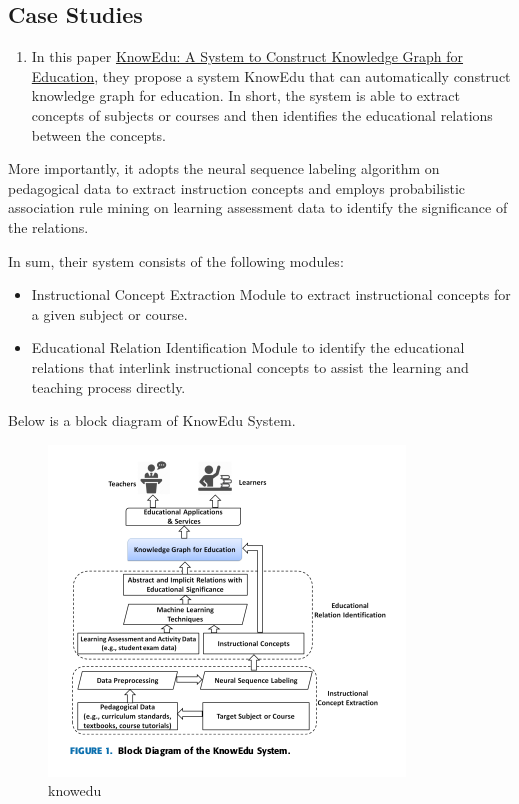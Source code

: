 \documentclass[]{book}
\providecommand{\tightlist}{%
  \setlength{\itemsep}{0pt}\setlength{\parskip}{0pt}}
\theoremstyle{definition}
\theoremstyle{definition}
\theoremstyle{definition}
\theoremstyle{remark}
\begin{document}
\subsection{Case Studies}\label{case-studies-5}

\begin{enumerate}
\def\labelenumi{\arabic{enumi}.}
\tightlist
\item
  In this paper
  \href{https://ieeexplore.ieee.org/document/8362657}{KnowEdu: A System
  to Construct Knowledge Graph for Education}, they propose a system
  KnowEdu that can automatically construct knowledge graph for
  education. In short, the system is able to extract concepts of
  subjects or courses and then identifies the educational relations
  between the concepts.
\end{enumerate}

More importantly, it adopts the neural sequence labeling algorithm on
pedagogical data to extract instruction concepts and employs
probabilistic association rule mining on learning assessment data to
identify the significance of the relations.

In sum, their system consists of the following modules:

\begin{itemize}
\item
  Instructional Concept Extraction Module to extract instructional
  concepts for a given subject or course.
\item
  Educational Relation Identification Module to identify the educational
  relations that interlink instructional concepts to assist the learning
  and teaching process directly.
\end{itemize}

Below is a block diagram of KnowEdu System.

\begin{figure}
\centering
\includegraphics{img/knowedu.png}
\caption{knowedu}
\end{figure}
\end{document}
